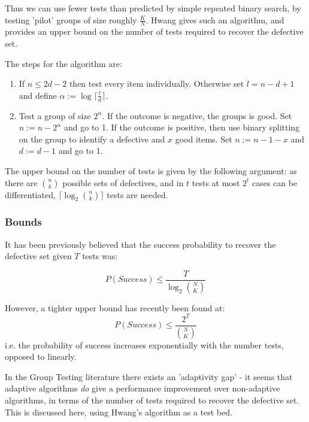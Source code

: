 Thus we can use fewer tests than predicted by simple repeated binary search, by testing 'pilot' groups of size roughly \(\frac{K}{N}\). Hwang \cite{Hwang1972} gives such an algorithm, and provides an upper bound on the number of tests required to recover the defective set.

The steps for the algorithm are:

\begin{enumerate}
\item If \(n \leq 2d-2\) then test every item individually. Otherwise set \(l = n - d + 1\) and define \(\alpha:=\log{\lceil \frac{l}{d}\rceil}\).
\item Test a group of size \(2^\alpha\). If the outcome is negative, the groups is good. Set \(n := n - 2^\alpha \) and go to 1. If the outcome is positive, then use binary splitting on the group to identify a defective and \(x\) good items. Set \(n := n - 1 -x \) and \(d:= d-1\) and go to 1.
\end{enumerate}

The upper bound on the number of tests is given by the following argument: as there are \(n \choose k\) possible sets of defectives, and in \(t\) tests at most \(2^t\) cases can be differentiated, \(\lceil \log_2{n \choose k} \rceil\) tests are needed. 

\subsubsection*{Bounds}
It has been previously believed that the success probability to recover the defective set given \(T\) tests was:

\begin{equation}
P\left(Success\right) \leq \frac{T}{\log_2{N \choose K}}
\end{equation}

However, a tighter upper bound has recently been found \cite{Aldridge2013} at:
%
\begin{equation}
P\left(Success\right) \leq \frac{2^T}{ {N \choose K} }
\end{equation}
%
i.e. the probability of success increases exponentially with the number tests, opposed to linearly. 

In the Group Testing literature there exists an 'adaptivity gap' - it seems that adaptive algorithms \textit{do} give a performance improvement over non-adaptive algorithms, in terms of the number of tests required to recover the defective set. This is discussed here, using Hwang's algorithm as a test bed.

